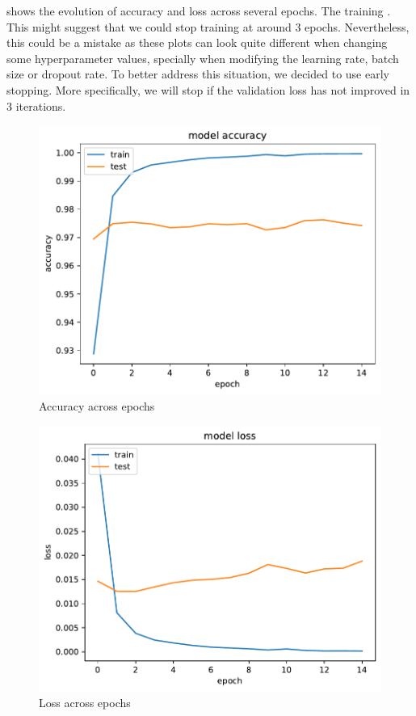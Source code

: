shows the evolution of accuracy and loss across several epochs. The training . This might suggest that we could stop training at around 3 epochs. Nevertheless, this could be a mistake as these plots can look quite different when changing some hyperparameter values, specially when modifying the learning rate, batch size or dropout rate. To better address this situation, we decided to use early stopping. More specifically, we will stop if the validation loss has not improved in 3 iterations.

\begin{figure}[H]
    \centering
    \includegraphics{figures/epoch-acc.pdf}
    \caption{Accuracy across epochs}
    \label{fig:epoch-acc}
\end{figure}

\begin{figure}[H]
    \centering
    \includegraphics{figures/epoch-loss.pdf}
    \caption{Loss across epochs}
    \label{fig:epoch-loss}
\end{figure}


